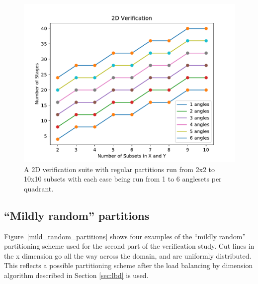 \begin{figure}[H]
\centering
\includegraphics[scale=0.8]{../figures/regular_verification.pdf}
\caption{A 2D verification suite with regular partitions run from 2x2 to 10x10 subsets with each case being run from 1 to 6 anglesets per quadrant.}
\label{regular_verification}
\end{figure}

\subsection{``Mildly random'' partitions}
Figure~\ref{mild_random_partitions} shows four examples of the ``mildly random'' partitioning scheme used for the second part of the verification study. Cut lines in the x dimension go all the way across the domain, and are uniformly distributed. This reflects a possible partitioning scheme after the load balancing by dimension algorithm described in Section \ref{sec:lbd} is used.

